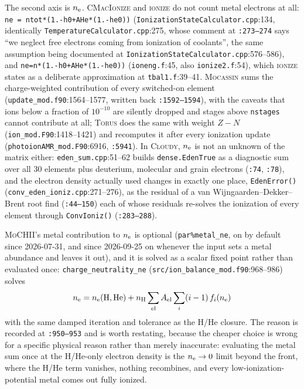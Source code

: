 \documentclass[english,a4paper]{my_memo}
\newcommand{\code}[1]{\texttt{#1}}
\newcommand{\MoCHII}{\textsc{MoCHII}}
\newcommand{\Wood}{\textsc{ionize}}
\newcommand{\CMI}{\textsc{CMacIonize}}
\newcommand{\Torus}{\textsc{Torus}}
\newcommand{\Mocassin}{\textsc{Mocassin}}
\newcommand{\Cloudy}{\textsc{Cloudy}}
\newcommand{\nelec}{n_{\rm e}}
\begin{document}
The second axis is $\nelec$.  \CMI{} and \Wood{} do not count metal electrons
at all: \code{ne = ntot*(1.-h0\allowbreak +AHe*(1.-he0))}
(\code{Ionization\allowbreak State\allowbreak Calculator.cpp}:134, identically
\code{Temperature\allowbreak Calculator.cpp}:275, whose comment at \code{:273--274} says
``we neglect free electrons coming from ionization of coolants'', the same
assumption being documented at
\code{Ionization\allowbreak State\allowbreak Calculator.cpp}:576--586), and
\code{ne=n*(1.-h0\allowbreak +AHe*(1.-he0))} (\code{ioneng.f}:45, also
\code{ionize2.f}:54), which \Wood{} states as a deliberate approximation at
\code{tbal1.f}:39--41.  \Mocassin{} sums the charge-weighted contribution of
every switched-on element (\code{update\_\allowbreak mod.f90}:1564--1577, written back
\code{:1592--1594}), with the caveats that ions below a fraction of
$10^{-10}$ are silently dropped and stages above \code{nstages} cannot
contribute at all; \Torus{} does the same with weight $Z-N$
(\code{ion\_mod.F90}:1418--1421) and recomputes it after every ionization
update (\code{photoion\allowbreak AMR\_\allowbreak mod.F90}:6916, \code{:5941}).  In \Cloudy{},
$\nelec$ is not an unknown of the matrix either: \code{eden\_sum.cpp}:51--62
builds \code{dense.EdenTrue} as a diagnostic sum over all 30 elements plus
deuterium, molecular and grain electrons (\code{:74}, \code{:78}), and the
electron density actually used changes in exactly one place,
\code{EdenError()} (\code{conv\_\allowbreak eden\_\allowbreak ioniz.cpp}:271--276), as the residual of
a van Wijngaarden--Dekker--Brent root find (\code{:44--150}) each of whose
residuals re-solves the ionization of every element through
\code{ConvIoniz()} (\code{:283--288}).

\MoCHII{}'s metal contribution to $\nelec$ is optional
(\code{par\%metal\_ne}, on by default since 2026-07-31, and since
2026-09-25 on whenever the input sets a metal abundance and leaves it out), and
it is solved as a scalar fixed point rather than evaluated once:
\code{charge\_\allowbreak neutrality\_\allowbreak ne} (\code{src/ion\_\allowbreak balance\_\allowbreak mod.f90}:968--986)
solves
\begin{equation}
 \nelec = \nelec({\rm H,He}) + n_{\rm H}\sum_{\rm el} A_{\rm el}
          \sum_i (i-1)\,f_i(\nelec)
 \label{eq:metalne}
\end{equation}
with the same damped iteration and tolerance as the H/He closure.  The reason
is recorded at \code{:950--953} and is worth restating, because the cheaper
choice is wrong for a specific physical reason rather than merely
inaccurate: evaluating the metal sum once at the H/He-only electron density
is the $\nelec\to0$ limit beyond the front, where the H/He term vanishes,
nothing recombines, and every low-ionization-potential metal comes out fully
ionized.
\end{document}
